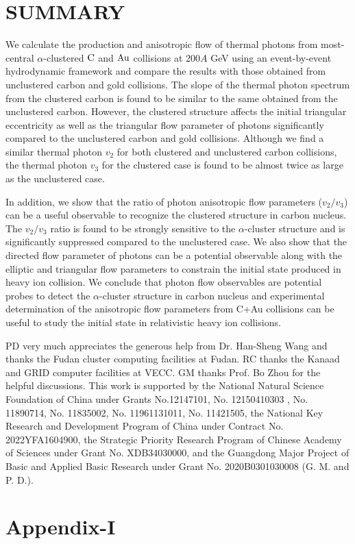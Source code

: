 \documentclass[aps,prc,twocolumn,floatfix,12pts,superscriptaddress]{revtex4}
\begin{document}
{{\section{SUMMARY}
We calculate the production and anisotropic flow of thermal photons from most-central $\alpha$-clustered ${\rm C}$ and ${\rm Au}$ collisions at $200A$ GeV using an event-by-event hydrodynamic framework and compare the results with those obtained from unclustered carbon and gold collisions. The slope of the thermal photon spectrum from the clustered carbon is found to be similar to the same obtained from the unclustered carbon. However, the clustered structure affects the initial triangular eccentricity as well as the triangular flow parameter of photons significantly compared to the unclustered carbon and gold collisions.  Although we find a similar thermal photon $v_2$ for both clustered and unclustered carbon collisions, the thermal photon $v_3$ for the clustered case is found to be almost twice as large as the unclustered case. 

In addition, we show that the ratio of photon anisotropic flow parameters ($v_2/v_3$) can be a useful observable to recognize the clustered structure in carbon nucleus.  The  $v_2/v_3$ ratio is found to be strongly sensitive to the $\alpha$-cluster structure and is significantly suppressed compared to the unclustered case. We also show that the directed flow parameter of photons can be a potential observable along with the elliptic and triangular flow parameters to constrain the initial state produced in heavy ion collision. We conclude that photon flow observables are potential probes to detect the  $\alpha$-cluster structure in carbon nucleus and experimental determination of the anisotropic flow parameters from C+Au collisions can be useful to study the initial state in relativistic heavy ion collisions.

\begin{acknowledgments}
	PD very much appreciates the generous help from Dr. Han-Sheng Wang and thanks the Fudan cluster computing facilities at Fudan. RC thanks the Kanaad and GRID computer facilities at VECC. GM thanks Prof. Bo Zhou for the helpful discussions. This work is supported by the National Natural Science Foundation of China under Grants  No.12147101, No. 12150410303 , No. 11890714, No. 11835002, No. 11961131011, No. 11421505, the National Key Research and Development Program of China under Contract No. 2022YFA1604900, the Strategic Priority Research Program of Chinese Academy of Sciences under Grant No. XDB34030000, and the Guangdong Major Project of Basic and Applied Basic Research under Grant No. 2020B0301030008 (G. M. and P. D.).  
\end{acknowledgments}
{ \section*{Appendix-I}

}}}
\end{document}

